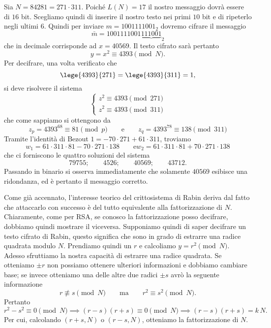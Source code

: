 	\begin{ese}
	Sia \(N=84281=271 \cdot 311\). Poiché \(L(N)=17\) il nostro messaggio dovrà essere di \(16\) bit. Scegliamo quindi di inserire il nostro testo nei primi \(10\) bit e di ripeterlo negli ultimi \(6\).
	Quindi per inviare \(m=1001111001_2\) dovremo cifrare il messaggio
		\[
		\bar{m} = {1001111001\underbrace{111001}}_2
		\]
	che in decimale corrisponde ad \(x=40569\). Il testo cifrato sarà pertanto
		\[
		y = x^2  \equiv 4393 \pmod{N}.
		\]
	Per decifrare, una volta verificato che
		\[
		\lege{4393}{271} = \lege{4393}{311} =1,
		\]
	si deve risolvere il sistema
		\[
		\begin{cases}
		z^2 \equiv 4393 \pmod{271}\\
		z^2 \equiv 4393 \pmod{311}
		\end{cases}
		\]
	che come sappiamo si ottengono da
		\[
		z_p = 4393^{68} \equiv 81 \pmod{p} \qquad\text{e}\qquad z_q = 4393^{78} \equiv 138 \pmod{311}
		\]
	Tramite l'identità di Bezout \(1=-70 \cdot 271 + 61 \cdot 311\), troviamo 
		\[
		w_1 = 61 \cdot 311 \cdot 81 - 70 \cdot 271 \cdot 138 \qquad\text{e} w_2 = 61 \cdot 311 \cdot 81 + 70 \cdot 271 \cdot 138
		\]
	che ci forniscono le quattro soluzioni del sistema
		\[
		79755; \qquad 4526; \qquad 40569; \qquad 43712.
		\]
	Passando in binario si osserva immediatamente che solamente \(40569\) esibisce una ridondanza, ed è pertanto il messaggio corretto.
	\end{ese}

	Come già accennato, l'interesse teorico  del crittosistema di Rabin deriva dal fatto che attaccarlo con successo è del tutto equivalente alla fattorizzazione di \(N\).
	Chiaramente, come per RSA, se conosco la fattorizzazione posso decifrare, dobbiamo quindi mostrare il viceversa.
	Supponiamo quindi di saper decifrare un testo cifrato di Rabin, questo significa che sono in grado di estrarre una radice quadrata modulo \(N\).
	Prendiamo quindi un \(r\) e calcoliamo \(y=r^2 \pmod{N}\). Adesso sfruttiamo la nostra capacità di estrarre una radice quadrata. Se otteniamo \(\pm r\) non possiamo ottenere ulteriori informazioni e dobbiamo cambiare base; se invece otteniamo una delle altre due radici \(\pm s\) avrò la seguente informazione
		\[
		r \not\equiv s \pmod{N} \qquad\text{ma}\qquad r^2 \equiv s^2 \pmod{N}.
		\]
	Pertanto
		\[
		r^2 - s^2 \equiv 0 \pmod{N} \implies (r-s)(r+s) \equiv 0 \pmod{N} \implies (r-s)(r+s) = k\,N.
		\]
	Per cui, calcolando \((r+s,N)\) o \((r-s,N)\), otteniamo la fattorizzazione di \(N\).
%
%
